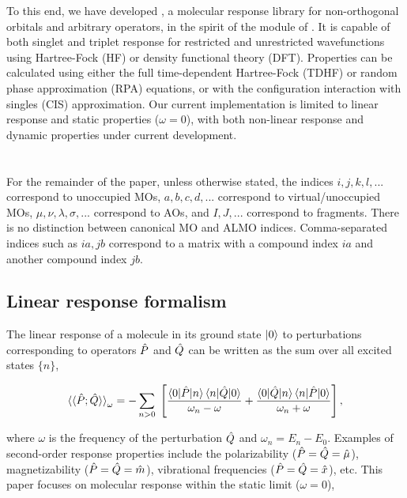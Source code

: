 To this end, we have developed \libresponse{}, a molecular response library for non-orthogonal orbitals and arbitrary operators, in the spirit of the \response{} module of \pdalton{}\cite{daltonpaper}. It is capable of both singlet\cite{doi:10.1063/1.454885} and triplet\cite{doi:10.1063/1.457471} response for restricted and unrestricted wavefunctions using Hartree-Fock (HF) or density functional theory (DFT). Properties can be calculated using either the full time-dependent Hartree-Fock (TDHF) or random phase approximation (RPA) equations, or with the configuration interaction with singles (CIS) approximation\cite{doi:10.1021/j100180a030}. Our current implementation is limited to linear response and static properties (\(\omega = 0\)), with both non-linear response and dynamic properties under current development.

\section{\texorpdfstring{}{Theory}}
\label{sec:theory}

For the remainder of the paper, unless otherwise stated, the indices \(i,j,k,l,...\) correspond to unoccupied MOs, \(a,b,c,d,...\) correspond to virtual/unoccupied MOs, \(\mu,\nu,\lambda,\sigma,...\) correspond to AOs, and \(I,J,...\) correspond to fragments. There is no distinction between canonical MO and ALMO indices. Comma-separated indices such as \(ia,jb\) correspond to a matrix with a compound index \(ia\) and another compound index \(jb\).

\subsection{Linear response formalism}
\label{ssec:linear-response-formalism}

The linear response of a molecule in its ground state \(\ket{0}\) to perturbations corresponding to operators \(\hat{P}\) and \(\hat{Q}\) can be written as the sum over all excited states \(\{n\}\),

\begin{equation}
  \braket{\braket{\hat{P}; \hat{Q}}}_{\omega}
  =
  - \sum_{n > 0} \;
    \left[
      \frac{\braket{0|\hat{P}|n} \braket{n|\hat{Q}|0}}{\omega_{n} - \omega}
    + \frac{\braket{0|\hat{Q}|n} \braket{n|\hat{P}|0}}{\omega_{n} + \omega}
    \right],
\end{equation}

where \(\omega\) is the frequency of the perturbation \(\hat{Q}\) and \(\omega_{n} = E_{n} - E_{0}\). Examples of second-order response properties include the polarizability (\(\hat{P} = \hat{Q} = \hat{\mu}\)), magnetizability (\(\hat{P} = \hat{Q} = \hat{m}\)), vibrational frequencies (\(\hat{P} = \hat{Q} = \hat{x}\)), etc. This paper focuses on molecular response within the static limit (\(\omega = 0\)),

